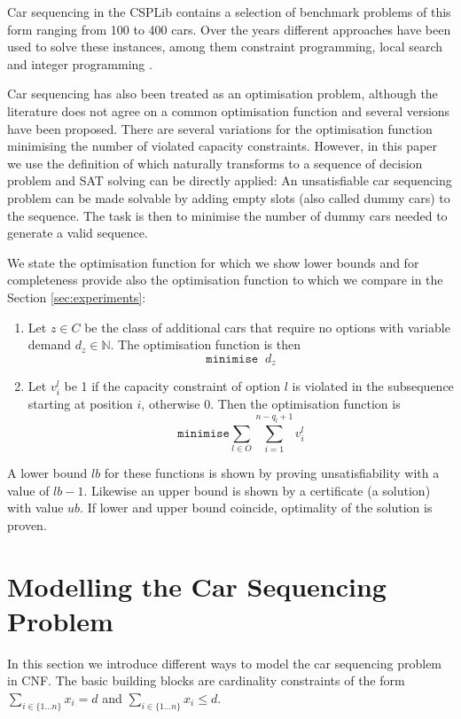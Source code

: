\documentclass[]{llncs}
\def\min{{\texttt{minimise}}}
\begin{document}
Car sequencing in the CSPLib contains a selection of benchmark problems of this form ranging from 100 to 400 cars. Over
the years different approaches have been used to solve these instances, among them constraint programming, local search
and integer programming \cite{Regin97}\cite{Gottlieb03}\cite{Gravel05}\cite{Estellon06}\cite{Siala12}.

Car sequencing has also been treated as an optimisation problem, although the literature does not agree on a common
optimisation function and several versions have been proposed. There are several variations for the optimisation
function minimising the number of violated capacity constraints. However, in this paper we use the definition of
\cite{Perron04} which naturally transforms to a sequence of decision problem and SAT solving can be directly applied:
An unsatisfiable car sequencing problem can be made solvable by adding empty slots (also called dummy cars) to
the sequence. The task is then to minimise the number of dummy cars needed to generate a valid sequence.
          
We state the optimisation function for which we show lower bounds and for completeness provide also the optimisation
function to which we compare in the Section \ref{sec:experiments}: 

\begin{enumerate} 
    \item Let $z\in C$ be the class of additional cars that require no options with variable demand $d_z \in
    \mathbb{N}$. The optimisation function is then $$\min \;\; d_z$$
    \item Let $v^l_{i}$ be 1 if the capacity constraint of option $l$ is violated in the subsequence starting at
        position $i$, otherwise 0. Then the optimisation function is $$\min \sum_{l\in O} \sum_{i=1}^{n-q_l+1} v_i^l$$
\end{enumerate} 

A lower bound $lb$ for these functions is shown by proving unsatisfiability with a value of $lb-1$. Likewise an upper
bound is shown by a certificate (a solution) with value $ub$. If lower and upper bound coincide, optimality of the
solution is proven. 

\section{Modelling the Car Sequencing Problem}
\label{sec:modelling}

In this section we introduce different ways to model the car sequencing problem in CNF. The basic building blocks are
cardinality constraints of the form $\sum_{i\in \{1\ldots n\}} x_{i} = d$ and $ \sum_{i\in \{1\ldots n\}} x_{i} \leq d
$.
\end{document}
